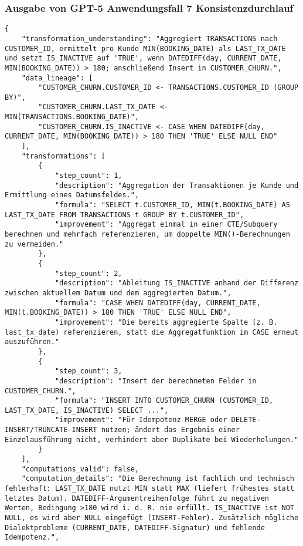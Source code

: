 \subsubsection{Ausgabe von GPT-5 Anwendungsfall 7 Konsistenzdurchlauf}\label{anhang:subsubsec:gpt_case7_prompt2}
\begin{lstlisting}[caption={Ausgabe: GPT-5 Anwendungsfall 7 Konsistenzdurchlauf},label={gpt_case7_prompt2}]
{
    "transformation_understanding": "Aggregiert TRANSACTIONS nach CUSTOMER_ID, ermittelt pro Kunde MIN(BOOKING_DATE) als LAST_TX_DATE und setzt IS_INACTIVE auf 'TRUE', wenn DATEDIFF(day, CURRENT_DATE, MIN(BOOKING_DATE)) > 180; anschließend Insert in CUSTOMER_CHURN.",
    "data_lineage": [
        "CUSTOMER_CHURN.CUSTOMER_ID <- TRANSACTIONS.CUSTOMER_ID (GROUP BY)",
        "CUSTOMER_CHURN.LAST_TX_DATE <- MIN(TRANSACTIONS.BOOKING_DATE)",
        "CUSTOMER_CHURN.IS_INACTIVE <- CASE WHEN DATEDIFF(day, CURRENT_DATE, MIN(BOOKING_DATE)) > 180 THEN 'TRUE' ELSE NULL END"
    ],
    "transformations": [
        {
            "step_count": 1,
            "description": "Aggregation der Transaktionen je Kunde und Ermittlung eines Datumsfeldes.",
            "formula": "SELECT t.CUSTOMER_ID, MIN(t.BOOKING_DATE) AS LAST_TX_DATE FROM TRANSACTIONS t GROUP BY t.CUSTOMER_ID",
            "improvement": "Aggregat einmal in einer CTE/Subquery berechnen und mehrfach referenzieren, um doppelte MIN()-Berechnungen zu vermeiden."
        },
        {
            "step_count": 2,
            "description": "Ableitung IS_INACTIVE anhand der Differenz zwischen aktuellem Datum und dem aggregierten Datum.",
            "formula": "CASE WHEN DATEDIFF(day, CURRENT_DATE, MIN(t.BOOKING_DATE)) > 180 THEN 'TRUE' ELSE NULL END",
            "improvement": "Die bereits aggregierte Spalte (z. B. last_tx_date) referenzieren, statt die Aggregatfunktion im CASE erneut auszuführen."
        },
        {
            "step_count": 3,
            "description": "Insert der berechneten Felder in CUSTOMER_CHURN.",
            "formula": "INSERT INTO CUSTOMER_CHURN (CUSTOMER_ID, LAST_TX_DATE, IS_INACTIVE) SELECT ...",
            "improvement": "Für Idempotenz MERGE oder DELETE-INSERT/TRUNCATE-INSERT nutzen; ändert das Ergebnis einer Einzelausführung nicht, verhindert aber Duplikate bei Wiederholungen."
        }
    ],
    "computations_valid": false,
    "computation_details": "Die Berechnung ist fachlich und technisch fehlerhaft: LAST_TX_DATE nutzt MIN statt MAX (liefert frühestes statt letztes Datum). DATEDIFF-Argumentreihenfolge führt zu negativen Werten, Bedingung >180 wird i. d. R. nie erfüllt. IS_INACTIVE ist NOT NULL, es wird aber NULL eingefügt (INSERT-Fehler). Zusätzlich mögliche Dialektprobleme (CURRENT_DATE, DATEDIFF-Signatur) und fehlende Idempotenz.",

\end{lstlisting}

